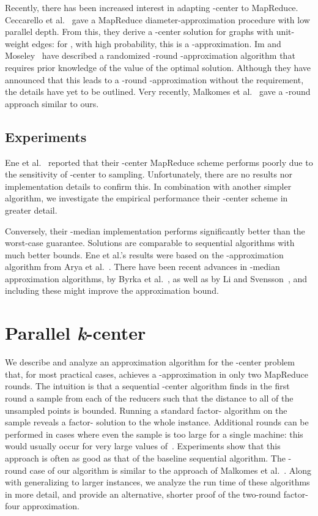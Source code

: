 \documentclass[11pt]{article}
\begin{document}
Recently, there has been increased interest in adapting -center
to Map\-Reduce. 
Ceccarello et al.~\cite{DBLP:CeccarelloPPU14} gave
a MapReduce diameter-approximation procedure with low parallel depth.
From this, they derive a
-center solution for graphs with unit-weight edges: 
for ,
with high probability, this is a -approximation. 
Im and Moseley~\cite{im2015} have described a
randomized -round -approximation algorithm that requires
prior knowledge of the value of the optimal solution.
Although they have announced that this leads
to a -round -approximation without the requirement,
the details have yet to be outlined.
Very recently, Malkomes et al.~\cite{malkomes2015fast} gave a -round approach similar to ours.



\subsection{Experiments}
Ene et al.~\cite{ene2011fast} reported that their -center MapReduce scheme
performs poorly due to the sensitivity of -center to sampling.
Unfortunately, there are no results nor implementation details to confirm this.
In combination with another simpler algorithm, we investigate the empirical performance their -center scheme in greater detail.

Conversely, their -median implementation performs significantly better than the worst-case guarantee.
Solutions are comparable to sequential algorithms with much better bounds. 
Ene et al.'s results were based on the -approximation algorithm
from Arya et al.~\cite{arya2004local}.
There have been recent advances in -median approximation algorithms, by Byrka et al.~\cite{DBLP:ByrkaPRST15}, as well as by Li and Svensson~\cite{li2013approximating}, and including these might improve the approximation bound.


\section{Parallel \emph{k}-center}

We describe and analyze an approximation algorithm for the -center problem that, for most practical cases, achieves a -approximation in only two MapReduce rounds.
The intuition is that a sequential -center algorithm finds in the first
round a sample from  each of the reducers
such that the distance to all of the unsampled points is bounded.
Running a standard factor- algorithm on the sample
reveals a factor- solution to the whole instance.
Additional rounds can be performed in cases where even the sample is too large
for a single machine:
this would usually occur for very large values of~. 
Experiments show that this approach is often as good as that of the baseline
sequential algorithm.
The -round case of our algorithm is similar to the approach of Malkomes et
al.~\cite{malkomes2015fast}.
Along with generalizing to larger instances, we analyze the run time of these
algorithms in more detail,
and provide an alternative, shorter proof of the two-round factor-four
approximation.
\end{document}
